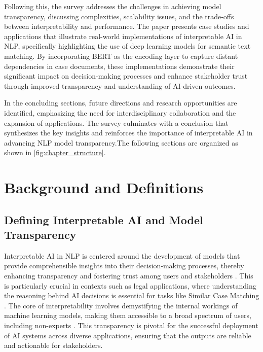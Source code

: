 Following this, the survey addresses the challenges in achieving model transparency, discussing complexities, scalability issues, and the trade-offs between interpretability and performance. The paper presents case studies and applications that illustrate real-world implementations of interpretable AI in NLP, specifically highlighting the use of deep learning models for semantic text matching. By incorporating BERT as the encoding layer to capture distant dependencies in case documents, these implementations demonstrate their significant impact on decision-making processes and enhance stakeholder trust through improved transparency and understanding of AI-driven outcomes. \cite{lin2023interpretabilityframeworksimilarcase}



In the concluding sections, future directions and research opportunities are identified, emphasizing the need for interdisciplinary collaboration and the expansion of applications. The survey culminates with a conclusion that synthesizes the key insights and reinforces the importance of interpretable AI in advancing NLP model transparency.The following sections are organized as shown in \autoref{fig:chapter_structure}.



\section{Background and Definitions} \label{sec:Background and Definitions}



\subsection{Defining Interpretable AI and Model Transparency} \label{subsec:Defining Interpretable AI and Model Transparency}



Interpretable AI in NLP is centered around the development of models that provide comprehensible insights into their decision-making processes, thereby enhancing transparency and fostering trust among users and stakeholders \cite{lin2023interpretabilityframeworksimilarcase}. This is particularly crucial in contexts such as legal applications, where understanding the reasoning behind AI decisions is essential for tasks like Similar Case Matching \cite{lin2023interpretabilityframeworksimilarcase}. The core of interpretability involves demystifying the internal workings of machine learning models, making them accessible to a broad spectrum of users, including non-experts \cite{sen2018supervisingfeatureinfluence}. This transparency is pivotal for the successful deployment of AI systems across diverse applications, ensuring that the outputs are reliable and actionable for stakeholders.



